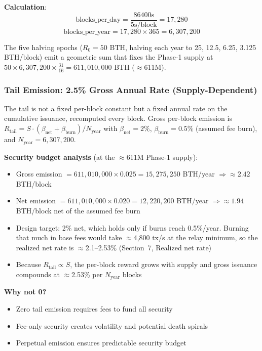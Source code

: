 \textbf{Calculation}:
\[
\text{blocks\_per\_day} = \frac{86400\text{s}}{5\text{s/block}} = 17{,}280
\]
\[
\text{blocks\_per\_year} = 17{,}280 \times 365 = 6{,}307{,}200
\]

The five halving epochs ($R_0 = 50$ BTH, halving each year to 25, 12.5, 6.25,
3.125 BTH/block) emit a geometric sum that fixes the Phase-1 supply at
$50 \times 6{,}307{,}200 \times \tfrac{31}{16} = 611{,}010{,}000$ BTH
($\approx$611M).

\subsubsection{Tail Emission: 2.5\% Gross Annual Rate (Supply-Dependent)}

The tail is not a fixed per-block constant but a fixed annual rate on the
cumulative issuance, recomputed every block. Gross per-block emission is
$R_{\text{tail}} = S \cdot (\beta_{\text{net}} + \beta_{\text{burn}}) /
N_{\text{year}}$ with $\beta_{\text{net}} = 2\%$, $\beta_{\text{burn}} = 0.5\%$
(assumed fee burn), and $N_{\text{year}} = 6{,}307{,}200$.

\textbf{Security budget analysis} (at the $\approx$611M Phase-1 supply):
\begin{itemize}
  \item Gross emission $= 611{,}010{,}000 \times 0.025 = 15{,}275{,}250$ BTH/year
    $\Rightarrow \approx 2.42$ BTH/block
  \item Net emission $= 611{,}010{,}000 \times 0.020 = 12{,}220{,}200$ BTH/year
    $\Rightarrow \approx 1.94$ BTH/block net of the assumed fee burn
  \item Design target: 2\% net, which holds only if burns reach 0.5\%/year.
    Burning that much in base fees would take $\approx$4,800 tx/s at the relay
    minimum, so the realized net rate is $\approx$2.1--2.53\% (Section~7, Realized
    net rate)
  \item Because $R_{\text{tail}} \propto S$, the per-block reward grows with
    supply and gross issuance compounds at $\approx$2.53\% per $N_{\text{year}}$
    blocks
\end{itemize}

\textbf{Why not 0?}
\begin{itemize}
  \item Zero tail emission requires fees to fund all security
  \item Fee-only security creates volatility and potential death spirals
  \item Perpetual emission ensures predictable security budget
\end{itemize}

